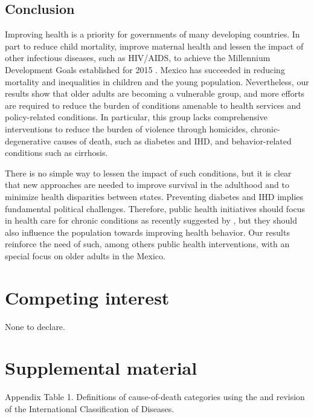 \documentclass[11.5pt]{article}
\begin{document}
\begin{spacing}{1.5}
\subsection*{Conclusion}
Improving health is a priority for governments of many developing countries. In part to reduce child mortality, improve maternal health and lessen the impact of other infectious diseases, such as HIV/AIDS, to achieve the Millennium Development Goals established for 2015 \citep{united2009millennium}.  Mexico has succeeded in reducing mortality and inequalities in children and the young population. Nevertheless, our results show that older adults are becoming a vulnerable group, and more efforts are required to reduce the burden of conditions amenable to health services and policy-related conditions. In particular, this group lacks comprehensive interventions to reduce the burden of violence through homicides, chronic-degenerative
causes of death, such as diabetes and IHD, and behavior-related conditions such as cirrhosis.  

There is no simple way to lessen the impact of such conditions, but it is clear that new approaches are needed to improve survival in the adulthood and to minimize health disparities between states. Preventing diabetes and IHD implies fundamental political challenges. Therefore,  public health initiatives should focus in health care for chronic conditions as recently suggested by \citet{knaul2015achieving}, but they should also influence the population towards improving health behavior. Our results reinforce the need of such, among others public health interventions, with an special focus on older adults in the Mexico. 


\end{spacing}

\section*{Competing interest}
None to declare.

%
\newpage
 
 
 
 \newpage
\section*{Supplemental material}
Appendix Table 1. Definitions of cause-of-death categories using the  and  revision of the International Classification of Diseases.\\
\end{document}
